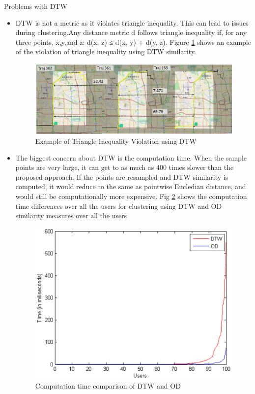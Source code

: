 Problems with DTW
\begin{itemize}
\item
DTW is not a metric as it violates triangle inequality. This can lead to issues during clustering.Any distance metric d follows triangle inequality if, for any three points, x,y,and z: d(x, z) ≤ d(x, y) + d(y, z).     Figure \ref{fig:dtw_triangleineq} shows an example of the violation of triangle inequality using DTW similarity.
\begin{figure}
\centering     
\includegraphics[scale=0.5]{figs/DTW_triangle_ineq.jpg}
\caption{Example of Triangle Inequality Violation using DTW }
\label{fig:dtw_triangleineq}  
\end{figure}

\item 
The biggest concern about DTW is the computation time. When the sample points are very large, it can get to as much as 400 times slower than the proposed approach. If the points are resampled and DTW similarity is computed, it would reduce to the same as pointwise Eucledian distance, and would still be computationally more expensive. Fig \ref{fig:time_dtw_od} shows the computation time differences over all the users for clustering using  DTW and OD similarity measures over all the users

\begin{figure}
\centering     
\includegraphics[scale=0.5]{figs/dtw_od_time.eps}
\caption{Computation time comparison of DTW and OD }
\label{fig:time_dtw_od}  
\end{figure}


\end{itemize}
